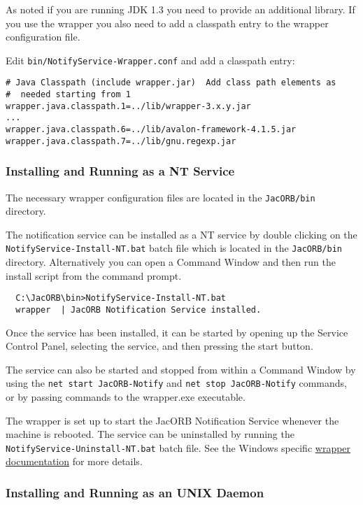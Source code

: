 As noted if you are running JDK 1.3 you need to provide an
additional library. If you use the wrapper you also need to add a
classpath entry to the wrapper configuration file.

Edit \texttt{bin/NotifyService-Wrapper.conf} and add a classpath
entry:

\begin{verbatim}
# Java Classpath (include wrapper.jar)  Add class path elements as
#  needed starting from 1
wrapper.java.classpath.1=../lib/wrapper-3.x.y.jar
...
wrapper.java.classpath.6=../lib/avalon-framework-4.1.5.jar
wrapper.java.classpath.7=../lib/gnu.regexp.jar
\end{verbatim}

\subsubsection{Installing and Running as a NT Service}
\label{sec:windows-service}

The necessary wrapper configuration files are located in the
\texttt{JacORB/bin} directory. 

The notification service can be installed as a NT service by double
clicking on the \texttt{NotifyService-Install-NT.bat} batch file which
is located in the \texttt{JacORB/bin} directory.
Alternatively you can open a Command Window and then run the install
script from the command prompt. 

\begin{verbatim}
  C:\JacORB\bin>NotifyService-Install-NT.bat
  wrapper  | JacORB Notification Service installed.
\end{verbatim}

Once the service has been installed, it can be started by opening up
the Service Control Panel, selecting the service, and then pressing
the start button.

The service can also be started and stopped from within a Command
Window by using the \texttt{net start JacORB-Notify} and \texttt{net
  stop JacORB-Notify} commands, or 
by passing commands to the wrapper.exe executable. 

The wrapper is set up to start the JacORB Notification Service
whenever the machine is rebooted. The service can be uninstalled by running the
\texttt{NotifyService-Uninstall-NT.bat} batch file. See the Windows specific
\href{http://wrapper.tanukisoftware.org/doc/english/launch-win.html}{wrapper
  documentation} for more details.
  
\subsubsection{Installing and Running as an UNIX Daemon}
\label{sec:inst-runn-as}

